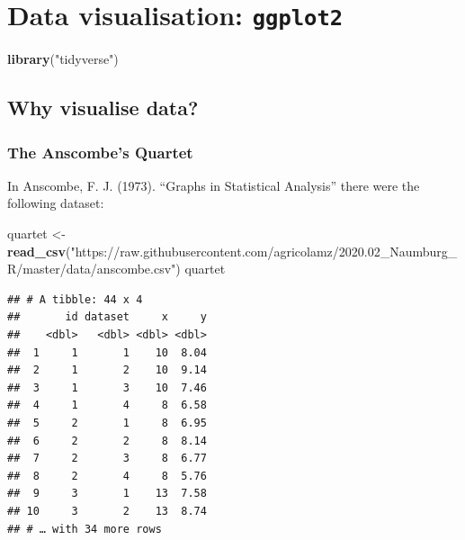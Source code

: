 \documentclass[
]{book}
\newenvironment{Shaded}{\begin{snugshade}}{\end{snugshade}}
\newcommand{\KeywordTok}[1]{\textcolor[rgb]{0.13,0.29,0.53}{\textbf{#1}}}
\newcommand{\NormalTok}[1]{#1}
\newcommand{\StringTok}[1]{\textcolor[rgb]{0.31,0.60,0.02}{#1}}
\begin{document}
\hypertarget{ggplot2}{%
\chapter{\texorpdfstring{Data visualisation: \texttt{ggplot2}}{Data visualisation: ggplot2}}\label{ggplot2}}

\begin{Shaded}
\begin{Highlighting}[]
\KeywordTok{library}\NormalTok{(}\StringTok{"tidyverse"}\NormalTok{)}
\end{Highlighting}
\end{Shaded}

\hypertarget{why-visualise-data}{%
\section{Why visualise data?}\label{why-visualise-data}}

\hypertarget{the-anscombes-quartet}{%
\subsection{The Anscombe's Quartet}\label{the-anscombes-quartet}}

In Anscombe, F. J. (1973). ``Graphs in Statistical Analysis'' there were the following dataset:

\begin{Shaded}
\begin{Highlighting}[]
\NormalTok{quartet <-}\StringTok{ }\KeywordTok{read_csv}\NormalTok{(}\StringTok{"https://raw.githubusercontent.com/agricolamz/2020.02_Naumburg_R/master/data/anscombe.csv"}\NormalTok{)}
\NormalTok{quartet}
\end{Highlighting}
\end{Shaded}

\begin{verbatim}
## # A tibble: 44 x 4
##       id dataset     x     y
##    <dbl>   <dbl> <dbl> <dbl>
##  1     1       1    10  8.04
##  2     1       2    10  9.14
##  3     1       3    10  7.46
##  4     1       4     8  6.58
##  5     2       1     8  6.95
##  6     2       2     8  8.14
##  7     2       3     8  6.77
##  8     2       4     8  5.76
##  9     3       1    13  7.58
## 10     3       2    13  8.74
## # … with 34 more rows
\end{verbatim}
\end{document}
